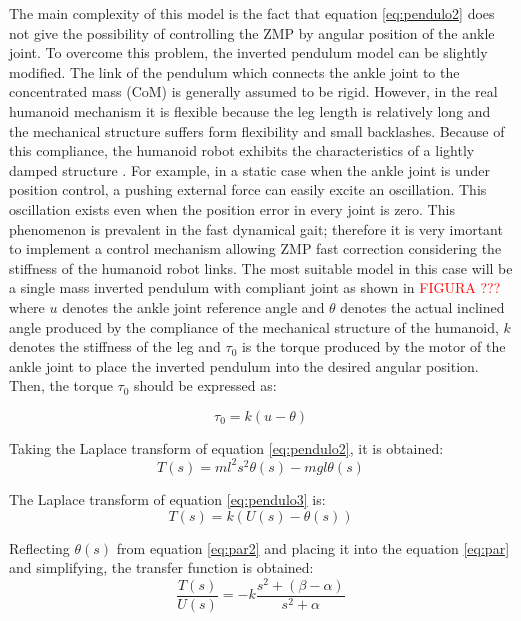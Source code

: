 The main complexity of this model is the fact that equation \ref{eq:pendulo2} does not give the possibility of controlling the ZMP by angular position of the ankle joint. To overcome this problem, the inverted pendulum model can be slightly modified. The link of the pendulum which connects the ankle joint to the concentrated mass (CoM) is generally assumed to be rigid. However, in the real humanoid mechanism it is flexible because the leg length is relatively long and the mechanical structure suffers form flexibility and small backlashes. Because of this compliance, the humanoid robot exhibits the characteristics of a lightly damped structure \cite{Kim2004}. For example, in a static case when the ankle joint is under position control, a pushing external force can easily excite an oscillation. This oscillation exists even when the position error in every joint is zero. This phenomenon is prevalent in the fast dynamical gait; therefore it is very imortant to implement a control mechanism allowing ZMP fast correction considering the stiffness of the humanoid robot links. The most suitable model in this case will be a single mass inverted pendulum with compliant joint as shown in \textcolor{red}{FIGURA ???} where $u$ denotes the ankle joint reference angle and $\theta$ denotes the actual inclined angle produced by the compliance of the mechanical structure of the humanoid, $k$ denotes the stiffness of the leg and $\tau_0$ is the torque produced by the motor of the ankle joint to place the inverted pendulum into the desired angular position. Then, the torque $\tau_0$ should be expressed as:

\begin{equation}
\tau_0 = k(u-\theta)
\label{eq:pendulo3}
\end{equation}

Taking the Laplace transform of equation \ref{eq:pendulo2}, it is obtained: 
\begin{equation}
T(s) = ml^2s^2\theta(s) - mgl\theta(s)
\label{eq:par}
\end{equation}

The Laplace transform of equation \ref{eq:pendulo3} is:
\begin{equation}
T(s) = k(U(s)-\theta(s))
\label{eq:par2}
\end{equation}

Reflecting $\theta(s)$ from equation \ref{eq:par2} and placing it into the equation \ref{eq:par} and simplifying, the transfer function is obtained:
\begin{equation}
\frac{T(s)}{U(s)} = -k \frac{s^2+(\beta - \alpha)}{s^2 + \alpha}
\label{eq:TFpar}
\end{equation}

